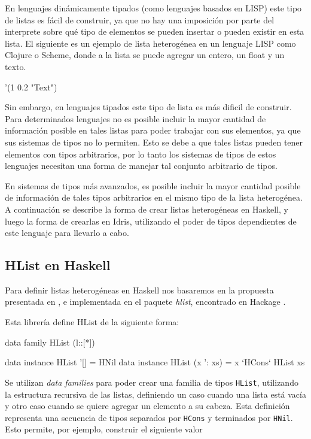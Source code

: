 En lenguajes dinámicamente tipados (como lenguajes basados en LISP) este tipo de listas es fácil de construir, ya que no hay una imposición por parte del interprete sobre qué tipo de elementos se pueden insertar o pueden existir en esta lista. El siguiente es un ejemplo de lista heterogénea en un lenguaje LISP como Clojure o Scheme, donde a la lista se puede agregar un entero, un float y un texto.

\begin{code}
'(1 0.2 "Text")
\end{code}

Sin embargo, en lenguajes tipados este tipo de lista es más dificil de construir. Para determinados lenguajes no es posible incluir la mayor cantidad de información posible en tales listas para poder trabajar con sus elementos, ya que sus sistemas de tipos no lo permiten. Esto se debe a que tales listas pueden tener elementos con tipos arbitrarios, por lo tanto los sistemas de tipos de estos lenguajes necesitan una forma de manejar tal conjunto arbitrario de tipos.

En sistemas de tipos más avanzados, es posible incluir la mayor cantidad posible de información de tales tipos arbitrarios en el mismo tipo de la lista heterogénea. 
A continuación se describe la forma de crear listas heterogéneas en Haskell, y luego la forma de crearlas en Idris, utilizando el poder de tipos dependientes de este lenguaje para llevarlo a cabo.

\subsection{HList en Haskell}

Para definir listas heterogéneas en Haskell nos basaremos en la propuesta presentada en \cite{Kiselyov:2004:STH:1017472.1017488}, e implementada en el paquete \textit{hlist}, encontrado en Hackage \cite{HListHackage}. 

Esta librería define HList de la siguiente forma:

\begin{code}
data family HList (l::[*])

data instance HList '[] = HNil
data instance HList (x ': xs) = x `HCons` HList xs
\end{code}

Se utilizan \textit{data families} para poder crear una familia de tipos \texttt{HList}, utilizando la estructura recursiva de las listas, definiendo un caso cuando una lista está vacía y otro caso cuando se quiere agregar un elemento a su cabeza.
Esta definición representa una secuencia de tipos separados por \texttt{HCons} y terminados por \texttt{HNil}. 
Esto permite, por ejemplo, construir el siguiente valor


